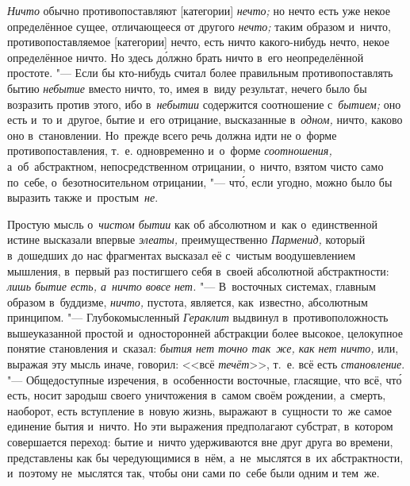{\em Ничто} обычно противопоставляют [категории] {\em нечто;} но нечто есть
уже некое определённое сущее, отличающееся от другого {\em нечто;} таким образом
и~ничто, противопоставляемое [категории] нечто, есть ничто какого-нибудь нечто,
некое определённое ничто. Но здесь д\'{о}лжно брать ничто в~его неопределённой
простоте. "--- Если бы кто-нибудь считал более правильным противопоставлять бытию
{\em небытие} вместо ничто, то, имея в~виду результат, нечего было бы возразить
против этого, ибо в~{\em небытии} содержится соотношение с~{\em бытием;} оно
есть и~то и~другое, бытие и~его отрицание, высказанные в~{\em одном,} ничто,
каково оно в~становлении. Но~прежде всего речь должна идти не о~форме
противопоставления, т.~е. одновременно и~о~форме {\em соотношения,}
а~об~абстрактном, непосредственном отрицании, о~ничто, взятом чисто само
по~себе, о~безотносительном отрицании, "--- чт\'{о}, если угодно, можно было бы
выразить также и~простым~{\em не}.

Простую мысль о~{\em чистом бытии} как об абсолютном и~как о~единственной
истине высказали впервые {\em элеаты,} преимущественно {\em Парменид,} который
в~дошедших до нас фрагментах высказал её с~чистым воодушевлением мышления,
в~первый раз постигшего себя в~своей абсолютной абстрактности:
{\em лишь бытие есть, а~ничто вовсе нет.} "--- В~восточных системах, главным
образом в~буддизме, {\em ничто,} пустота, является, как~известно, абсолютным
принципом. "--- Глубокомысленный {\em Гераклит} выдвинул в~противоположность
вышеуказанной простой и~односторонней абстракции более высокое, целокупное
понятие становления и~сказал: {\em бытия нет точно так~же, как нет ничто,} или,
выражая эту мысль иначе, говорил: <<всё {\em течёт}>>, т.~е. всё есть
{\em становление}. "--- Общедоступные изречения, в~особенности восточные,
гласящие, что всё, чт\'{о} есть, носит зародыш своего уничтожения в~самом своём
рождении, а~смерть, наоборот, есть вступление в~новую жизнь, выражают
в~сущности то~же самое единение бытия и~ничто. Но эти выражения предполагают
субстрат, в~котором совершается переход: бытие и~ничто удерживаются вне друг
друга во времени, представлены как бы чередующимися в~нём, а~не~мыслятся в~их
абстрактности, и~поэтому не~мыслятся так, чтобы они сами по~себе были одним и
тем~же.

